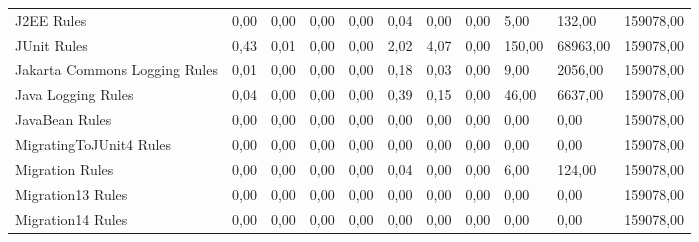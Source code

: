 \begin{table}[H]
{\begin{tabular}{@{}lp{10mm}p{10mm}p{10mm}p{10mm}llllll@{}}
J2EE Rules                          & 0,00           & 0,00                    & 0,00             & 0,00          & 0,04                           & 0,00                              & 0,00            & 5,00            & 132,00         & 159078,00       \\
JUnit Rules                         & 0,43           & 0,01                    & 0,00             & 0,00          & 2,02                           & 4,07                              & 0,00            & 150,00          & 68963,00       & 159078,00       \\
Jakarta Commons Logging Rules       & 0,01           & 0,00                    & 0,00             & 0,00          & 0,18                           & 0,03                              & 0,00            & 9,00            & 2056,00        & 159078,00       \\
Java Logging Rules                  & 0,04           & 0,00                    & 0,00             & 0,00          & 0,39                           & 0,15                              & 0,00            & 46,00           & 6637,00        & 159078,00       \\
JavaBean Rules                      & 0,00           & 0,00                    & 0,00             & 0,00          & 0,00                           & 0,00                              & 0,00            & 0,00            & 0,00           & 159078,00       \\
MigratingToJUnit4 Rules             & 0,00           & 0,00                    & 0,00             & 0,00          & 0,00                           & 0,00                              & 0,00            & 0,00            & 0,00           & 159078,00       \\
Migration Rules                     & 0,00           & 0,00                    & 0,00             & 0,00          & 0,04                           & 0,00                              & 0,00            & 6,00            & 124,00         & 159078,00       \\
Migration13 Rules                   & 0,00           & 0,00                    & 0,00             & 0,00          & 0,00                           & 0,00                              & 0,00            & 0,00            & 0,00           & 159078,00       \\
Migration14 Rules                   & 0,00           & 0,00                    & 0,00             & 0,00          & 0,00                           & 0,00                              & 0,00            & 0,00            & 0,00           & 159078,00       \\

\end{tabular}}
\end{table}
